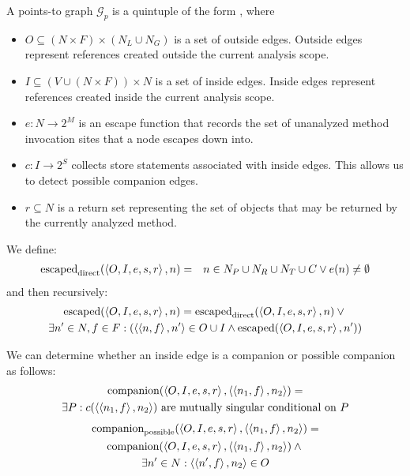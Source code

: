 \documentclass[11pt,notitlepage]{article}
\begin{document}
A points-to graph $\mathcal{G}_p$ is a quintuple of the form , where
\begin{itemize}
\item $O \subseteq (N\times F)\times(N_L \cup N_G)$ is a set of
outside edges.  Outside edges represent references created outside the
current analysis scope.
\item $I \subseteq (V\cup(N\times F))\times N$ is a set of inside
edges.  Inside edges represent references created inside the current
analysis scope.
\item $e:N\to 2^M$ is an escape function that records the set of
unanalyzed method invocation sites that a node escapes down into.
\item $c:I\to 2^S$ collects store statements associated with
inside edges.  This allows us to detect possible companion edges.
\item $r \subseteq N$ is a return set representing the set of objects
that may be returned by the currently analyzed method.
\end{itemize}
We define:
\begin{eqnarray*}
\text{escaped}_\text{direct}(\left\langle O,I,e,s,r \right\rangle, n) &=&
 n\in N_P \cup N_R \cup N_T \cup C
 \vee
 e(n)\neq\emptyset
\end{eqnarray*}
and then recursively:
\begin{multline*}
\text{escaped}%
              (\tuple{O,I,e,s,r},n) =
 \text{escaped}_\text{direct}(\tuple{O,I,e,s,r},n) \vee {}
\\
 \exists n'\in N,f\in F : \left(\tuple{\tuple{n,f},n'}\in O\cup I
 \wedge
 \text{escaped}%
               (\tuple{O,I,e,s,r},n')\right)
\end{multline*}

We can determine whether an inside edge is a companion or possible
companion as follows:
\begin{multline*}
\text{companion}(\left\langle O,I,e,s,r \right\rangle,\left\langle \left\langle n_1,f \right\rangle,n_2 \right\rangle)=\\
\exists P : c(\left\langle \left\langle n_1,f \right\rangle,n_2 \right\rangle)
\text{ are mutually singular conditional on }P
\end{multline*}
\begin{multline*}
\text{companion}_\text{possible}(\left\langle O,I,e,s,r \right\rangle,\left\langle \left\langle n_1,f \right\rangle,n_2 \right\rangle)=
\\
\text{companion}(\left\langle O,I,e,s,r \right\rangle,\left\langle \left\langle n_1,f \right\rangle,n_2 \right\rangle) \wedge {}\\
\exists n'\in N:\left\langle \left\langle n',f \right\rangle,n_2 \right\rangle\in O
\end{multline*}
\end{document}
